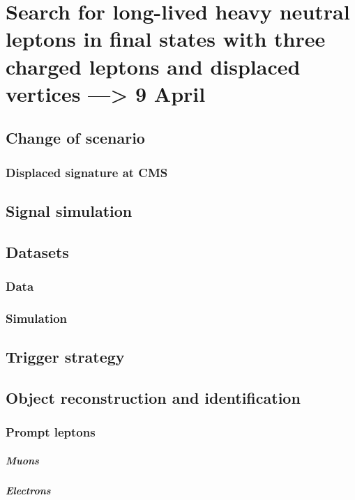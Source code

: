 
\chapter{Search for long-lived heavy neutral leptons in final states
with three charged leptons and displaced vertices  ---> 9 April} %

\label{Chapter5} %

\section{Change of scenario}
\subsection{Displaced signature at CMS}

\section{Signal simulation}
\section{Datasets}
\subsection{Data}
\subsection{Simulation}

\section{Trigger strategy}
\section{Object reconstruction and identification}
\subsection{Prompt leptons}
\paragraph {Muons}
\paragraph {Electrons}

